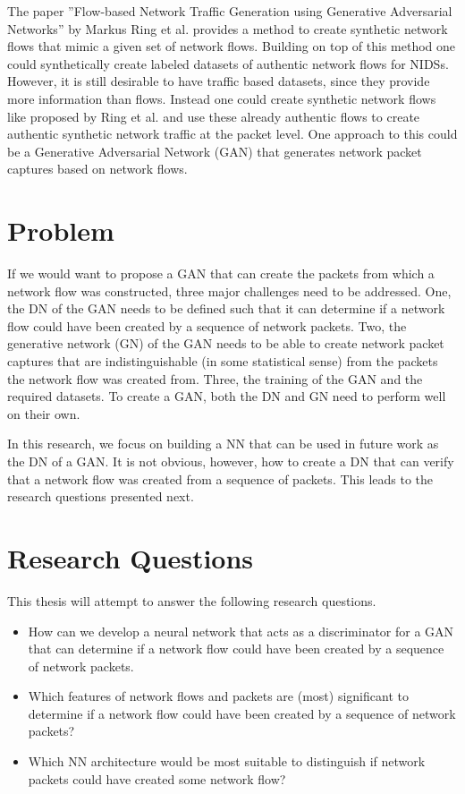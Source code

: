 \documentclass[
	ngerman,
	ruledheaders=section,%
	class=report,%
	thesis={type=bachelor},%
	accentcolor=9c,%
	custommargins=true,%
	marginpar=false,%
	parskip=half-,%
	fontsize=11pt,%
]{tudapub}
\begin{document}
The paper ''Flow-based Network Traffic Generation using Generative Adversarial Networks'' by Markus Ring et al. \cite{ringFlowbasedNetworkTraffic2019a} provides a method to create synthetic network flows that mimic a given set of network flows.
Building on top of this method one could synthetically create labeled datasets of authentic network flows for NIDSs.
However, it is still desirable to have traffic based datasets, since they provide more information than flows.
Instead one could create synthetic network flows like proposed by Ring et al. \cite{ringFlowbasedNetworkTraffic2019a} and
use these already authentic flows to create authentic synthetic network traffic at the packet level.
One approach to this could be a Generative Adversarial Network (GAN) that generates network packet captures based on network flows.

\section{Problem}

If we would want to propose a GAN that can create the packets from which a network flow was constructed,
three major challenges need to be addressed.
One, the DN of the GAN needs to be defined such that it can determine if a network flow could have been created by a sequence of network packets.
Two, the generative network (GN) of the GAN needs to be able to create network packet captures that are indistinguishable (in some statistical sense) from the packets the network flow was created from.
Three, the training of the GAN and the required datasets.
To create a GAN, both the DN and GN need to perform well on their own.

In this research, we focus on building a NN that can be used in future work as the DN of a GAN.
It is not obvious, however, how to create a DN that
can verify that a network flow was created from a sequence of packets.
This leads to the research questions presented next.

\section{Research Questions}

This thesis will attempt to answer the following research questions.

\begin{itemize}
  \item How can we develop a neural network that acts as a discriminator for a GAN
  that can determine if a network flow could have been created by a sequence of network packets.
  \item Which features of network flows and packets are (most) significant to determine if a network flow could have been created by a sequence of network packets?
  \item Which NN architecture would be most suitable to distinguish if network packets could have created some network flow?
\end{itemize}
\end{document}
